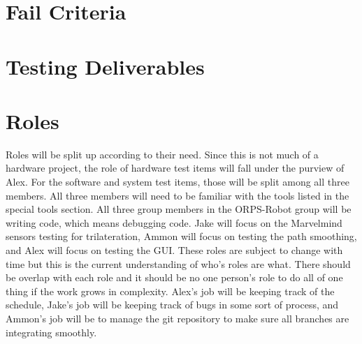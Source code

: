 \documentclass[english,12pt]{article}
\begin{document}
\section{Fail Criteria}

\section{Testing Deliverables}

\section{Roles}
Roles will be split up according to their need. Since this is not much of a hardware project, 
the role of hardware test items will fall under the purview of Alex. For the software and 
system test items, those will be split among all three members. All three members will need to 
be familiar with the tools listed in the special tools section. All three group members in the 
ORPS-Robot group will be writing code, which means debugging code. Jake will focus on the 
Marvelmind sensors testing for trilateration, Ammon will focus on testing the path smoothing, 
and Alex will focus on testing the GUI. These roles are subject to change with time but this is 
the current understanding of who's roles are what. There should be overlap with each role and 
it should be no one person's role to do all of one thing if the work grows in complexity. Alex's 
job will be keeping track of the schedule, Jake's job will be keeping track of bugs in some sort of 
process, and Ammon's job will be to manage the git repository to make sure all branches are integrating 
smoothly.
\end{document}

